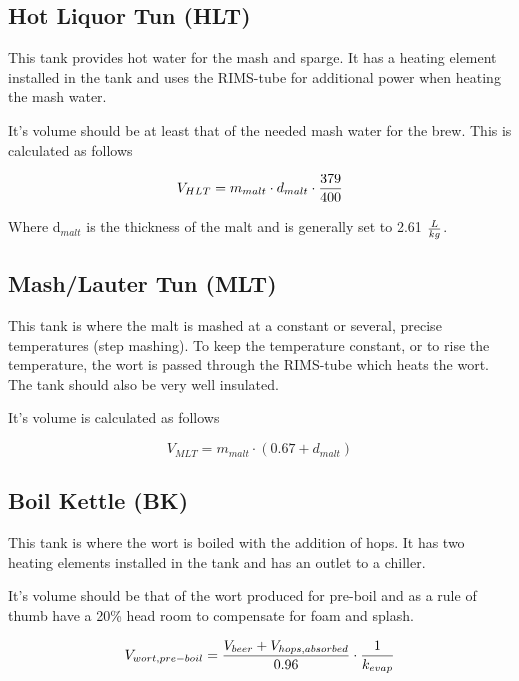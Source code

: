 \documentclass[11pt,fleqn]{book} %
\begin{document}
\subsection{Hot Liquor Tun (HLT)}

This tank provides hot water for the mash and sparge. It has a heating element installed in the tank and uses the RIMS-tube for additional power when heating the mash water.

It's volume should be at least that of the needed mash water for the brew. This is calculated as follows

\begin{equation}
V_{HLT} = m_{malt} \cdot d_{malt} \cdot {379 \over 400}
\end{equation}

Where d$_{malt}$ is the thickness of the malt and is generally set to 2.61 $L\over kg $.

\subsection{Mash/Lauter Tun (MLT)}

This tank is where the malt is mashed at a constant or several, precise temperatures (step mashing). To keep the temperature constant, or to rise the temperature, the wort is passed through the RIMS-tube which heats the wort. The tank should also be very well insulated.

It's volume is calculated as follows

\begin{equation}
V_{MLT} = m_{malt} \cdot (0.67 + d_{malt})
\end{equation}

\subsection{Boil Kettle (BK)}

This tank is where the wort is boiled with the addition of hops. It has two heating elements installed in the tank and has an outlet to a chiller.

It's volume should be that of the wort produced for pre-boil and as a rule of thumb have a 20\% head room to compensate for foam and splash.

\begin{equation}
V_{wort, pre-boil} = {{V_{beer} + V_{hops, absorbed}} \over 0.96} \cdot {1 \over k_{evap}}
\end{equation}
\end{document}
